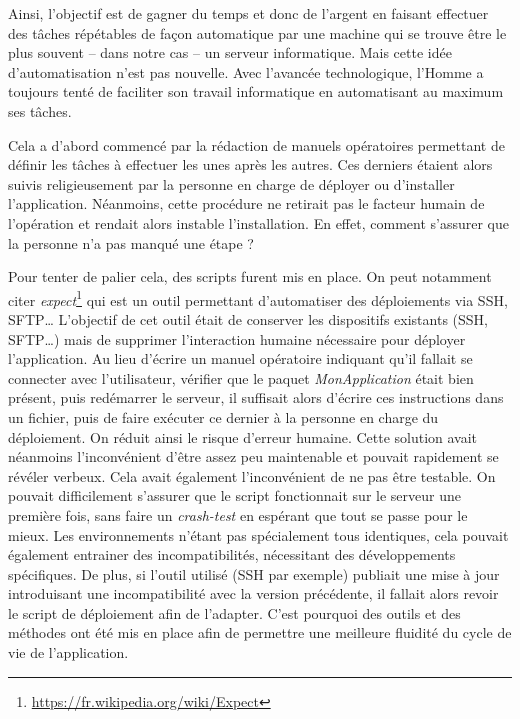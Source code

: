 Ainsi, l'objectif est de gagner du temps et donc de l'argent en faisant effectuer des tâches répétables de façon automatique par une machine qui se trouve être le plus souvent -- dans notre cas -- un serveur informatique. Mais cette idée d'automatisation n'est pas nouvelle. Avec l'avancée technologique, l'Homme a toujours tenté de faciliter son travail informatique en automatisant au maximum ses tâches. 

Cela a d'abord commencé par la rédaction de manuels opératoires permettant de définir les tâches à effectuer les unes après les autres. Ces derniers étaient alors suivis religieusement par la personne en charge de déployer ou d'installer l'application. Néanmoins, cette procédure ne retirait pas le facteur humain de l'opération et rendait alors instable l'installation. En effet, comment s'assurer que la personne n'a pas manqué une étape ? 

Pour tenter de palier cela, des scripts furent mis en place. On peut notamment citer \emph{expect}\footnote{\url{https://fr.wikipedia.org/wiki/Expect}} qui est un outil permettant d'automatiser des déploiements via \gls{SSH}, \gls{SFTP}\ldots{} L'objectif de cet outil était de conserver les dispositifs existants (\gls{SSH}, \gls{SFTP}\ldots) mais de supprimer l'interaction humaine nécessaire pour déployer l'application. Au lieu d'écrire un manuel opératoire indiquant qu'il fallait se connecter avec l'utilisateur, vérifier que le paquet \emph{MonApplication} était bien présent, puis redémarrer le serveur, il suffisait alors d'écrire ces instructions dans un fichier, puis de faire exécuter ce dernier à la personne en charge du déploiement. On réduit ainsi le risque d'erreur humaine. Cette solution avait néanmoins l'inconvénient d'être assez peu maintenable et pouvait rapidement se révéler verbeux. Cela avait également l'inconvénient de ne pas être testable. On pouvait difficilement s'assurer que le script fonctionnait sur le serveur une première fois, sans faire un \emph{crash-test} en espérant que tout se passe pour le mieux. Les environnements n'étant pas spécialement tous identiques, cela pouvait également entrainer des incompatibilités, nécessitant des développements spécifiques. De plus, si l'outil utilisé (\gls{SSH} par exemple) publiait une mise à jour introduisant une incompatibilité avec la version précédente, il fallait alors revoir le script de déploiement afin de l'adapter. C'est pourquoi des outils et des méthodes ont été mis en place afin de permettre une meilleure fluidité du cycle de vie de l'application. 

